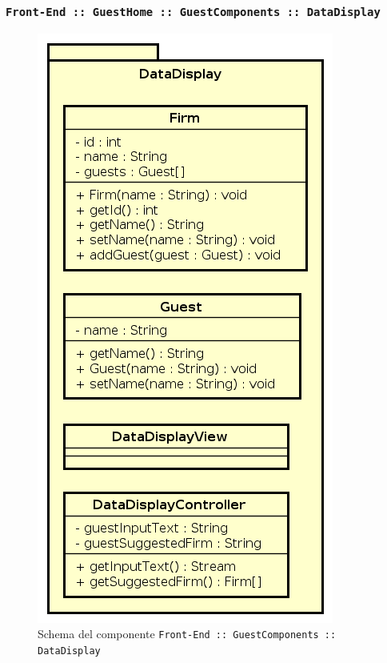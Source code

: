 \documentclass[../DefinizioneDiProdotto.tex]{subfiles}
\begin{document}
	\subsubsection{ \texttt{Front-End :: GuestHome :: GuestComponents :: DataDisplay}}
	\begin{figure}[!h]
		\centering
		\includegraphics[scale=0.7]{Architettura/Front-End/GuestHome/Components/DataDisplay.png}
		\caption{Schema del componente \texttt{Front-End :: GuestComponents :: DataDisplay}}
	\end{figure}
\end{document}
